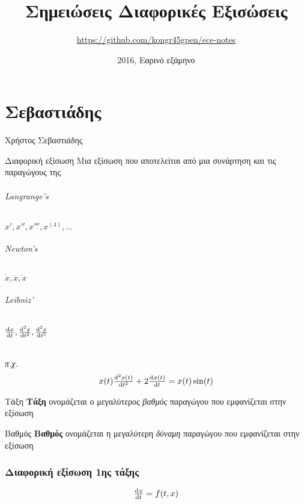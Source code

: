 \documentclass[11pt,a4paper,titlepage,final]{article}
\title{Σημειώσεις Διαφορικές Εξισώσεις}
\date{2016, Εαρινό εξάμηνο}
\author{\textlatin{\url{https://github.com/kongr45gpen/ece-notes}}}
\begin{document}
\maketitle

\tableofcontents

\newpage

\part{Σεβαστιάδης}
Χρήστος Σεβαστιάδης


\begin{defn*}{Διαφορική εξίσωση}
Μια εξίσωση που αποτελείται από μια συνάρτηση και τις παραγώγους της
\end{defn*}

\paragraph{\textlatin{Langrange's}}
\(x',x'',x''',x^{(4)},\dots\)
\paragraph{\textlatin{Newton's}}
\(\dot{x}, \ddot{x}, \dddot{x}\)
\paragraph{\textlatin{Leibniz'}}
\(\od{x}{t}, \od[2]{x}{t}, \od[3]{x}{t}\)

\paragraph{}
\textit{π.χ.}
\[
x(t) \od[2]{x(t)}{t} + 2 \od{x(t)}{t}=x(t)\sin (t)
\]

\begin{defn}{Τάξη}{}
\textbf{Τάξη} ονομάζεται ο μεγαλύτερος \emph{βαθμός} παραγώγου που εμφανίζεται στην εξίσωση
\end{defn}

\begin{defn}{Βαθμός}{}
\textbf{Βαθμός} ονομάζεται η μεγαλύτερη \emph{δύναμη} παραγώγου που εμφανίζεται στην εξίσωση
\end{defn}


\section{Διαφορική εξίσωση 1ης τάξης}
\begin{defn*}{}
\[
\od{x}{t}=f(t,x)
\]
\end{defn*}
\end{document}
